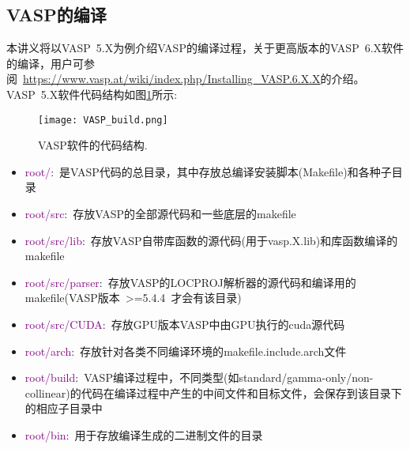 \subsection{VASP的编译}
本讲义将以\textrm{VASP~5.X}为例介绍\textrm{VASP}的编译过程，关于更高版本的\textrm{VASP~6.X}软件的编译，用户可参阅~\url{https://www.vasp.at/wiki/index.php/Installing_VASP.6.X.X}的介绍。\textrm{VASP~5.X}软件代码结构如图\ref{Fig:VASP_build}所示:~
\begin{figure}[h!]
\centering
\texttt{[image: VASP\_build.png]}
\caption{\small \textrm{VASP}软件的代码结构.}%
\label{Fig:VASP_build}
\end{figure}
\begin{itemize}
	\item \textcolor{purple}{root/}:~是\textrm{VASP}代码的总目录，其中存放总编译安装脚本(\textrm{Makefile})和各种子目录
	\item \textcolor{purple}{root/src}:~存放\textrm{VASP}的全部源代码和一些底层的\textrm{makefile}
	\item \textcolor{purple}{root/src/lib}:~存放\textrm{VASP}自带库函数的源代码(用于\textrm{vasp.X.lib})和库函数编译的\textrm{makefile}
	\item \textcolor{purple}{root/src/parser}:~存放\textrm{VASP}的\textrm{LOCPROJ}解析器的源代码和编译用的\textrm{makefile}(\textrm{VASP}版本\textrm{~>=5.4.4~}才会有该目录)
	\item \textcolor{purple}{root/src/CUDA}:~存放\textrm{GPU}版本\textrm{VASP}中由\textrm{GPU}执行的\textrm{cuda}源代码
	\item \textcolor{purple}{root/arch}:~存放针对各类不同编译环境的\textrm{makefile.include.arch}文件
	\item \textcolor{purple}{root/build}:~\textrm{VASP}编译过程中，不同类型(如\textrm{standard}/\textrm{gamma-only}/\textrm{non-collinear})的代码在编译过程中产生的中间文件和目标文件，会保存到该目录下的相应子目录中
	\item \textcolor{purple}{root/bin}:~用于存放编译生成的二进制文件的目录
\end{itemize}

